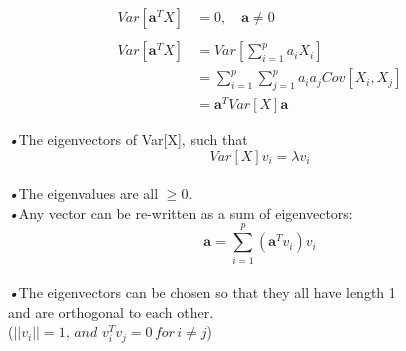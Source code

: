 \documentclass{beamer}
\begin{document}
\begin{frame}
\begin{equation*}
\begin{aligned}
Var\left[ \textbf{a}^{T} X\right] &= 0,\quad \textbf{a} \neq 0
\\\mbox{}
\\Var\left[ \textbf{a}^{T} X\right] &= Var\left[ \sum_{i=1}^{p} a_i X_i\right]
\\&=\sum_{i=1}^{p}\sum_{j=1}^{p}a_ia_j Cov\left[ X_i, X_j\right] 
\\&=\textbf{a}^{T} Var\left[ X\right] \textbf{a}
\end{aligned}
\end{equation*}
\end{frame}

\begin{frame}
\emph{•}The eigenvectors of Var[X], such that
\begin{equation*}
Var\left[ X\right] v_i=\lambda v_i
\end{equation*}
\\\emph{•}The eigenvalues are all $≥ 0$.
\\\emph{•}Any vector can be re-written as a sum of eigenvectors:
\begin{equation*}
\textbf{a}=\sum_{i=1}^{p}\left( \textbf{a}^{T} v_i\right) v_i
\end{equation*}
\\\emph{•}The eigenvectors can be chosen so that they all have length 1
\\\quad and are orthogonal to each other.
\\\quad ($||v_i||=1 ,\,and\,\, v_i^T v_j = 0 \,for\, i\neq j$)
\end{frame}
\end{document}
